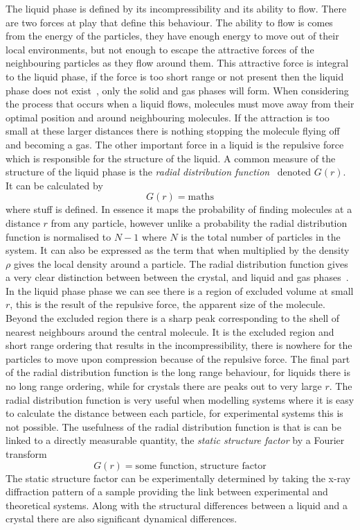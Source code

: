 The liquid phase is defined by its incompressibility and its ability to flow. There are two forces at play that define this behaviour. The ability to flow is comes from the energy of the particles, they have enough energy to move out of their local environments, but not enough to escape the attractive forces of the neighbouring particles as they flow around them. This attractive force is integral to the liquid phase, if the force is too short range or not present then the liquid phase does not exist~\tocite, only the solid and gas phases will form. When considering the process that occurs when a liquid flows, molecules must move away from their optimal position and around neighbouring molecules. If the attraction is too small at these larger distances there is nothing stopping the molecule flying off and becoming a gas. The other important force in a liquid is the repulsive force which is responsible for the structure of the liquid. A common measure of the structure of the liquid phase is the \emph{radial distribution function}~ denoted $G(r)$. It can be calculated by
\begin{equation}
    G(r) = \text{maths}
\end{equation}
where stuff is defined. In essence it maps the probability of finding molecules at a distance $r$ from any particle, however unlike a probability the radial distribution function is normalised to $N-1$ where $N$ is the total number of particles in the system. It can also be expressed as the term that when multiplied by the density $\rho$ gives the local density around a particle. The radial distribution function gives a very clear distinction between between the crystal, and liquid and gas phases~. In the liquid phase phase we can see there is a region of excluded volume at small $r$, this is the result of the repulsive force, the apparent size of the molecule. Beyond the excluded region there is a sharp peak corresponding to the shell of nearest neighbours around the central molecule. It is the excluded region and short range ordering that results in the incompressibility, there is nowhere for the particles to move upon compression because of the repulsive force. The final part of the radial distribution function is the long range behaviour, for liquids there is no long range ordering, while for crystals there are peaks out to very large $r$. The radial distribution function is very useful when modelling systems where it is easy to calculate the distance between each particle, for experimental systems this is not possible. The usefulness of the radial distribution function is that is can be linked to a directly measurable quantity, the \emph{static structure factor} by a Fourier transform
\begin{equation}
    G(r) = \text{some function, structure factor}
\end{equation}
The static structure factor can be experimentally determined by taking the x-ray diffraction pattern of a sample providing the link between experimental and theoretical systems. Along with the structural differences between a liquid and a crystal there are also significant dynamical differences.

